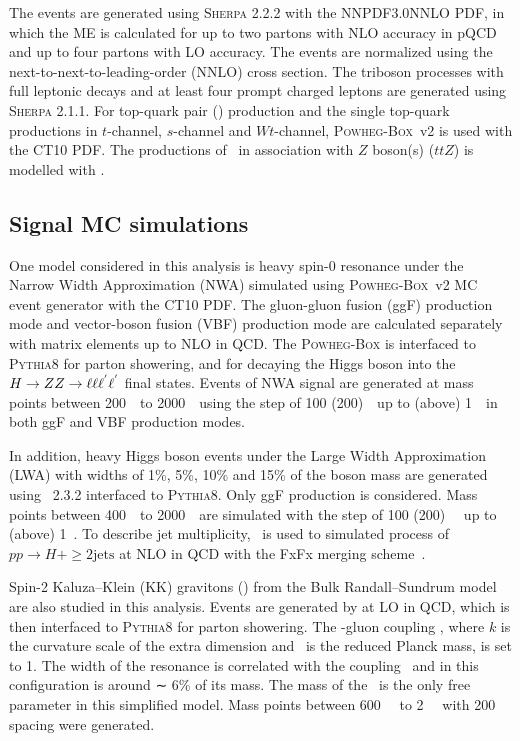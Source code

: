 The \Zjet events are generated using \textsc{Sherpa} 2.2.2 with the NNPDF3.0NNLO PDF,
in which the ME is calculated for up to two partons with NLO accuracy in pQCD and up to four partons with LO accuracy.
The \Zjet events are normalized using the next-to-next-to-leading-order (NNLO) cross section.
The triboson processes with full leptonic decays and at least four prompt charged leptons are generated using \textsc{Sherpa} 2.1.1.
For top-quark pair (\ttbar) production and the single top-quark productions in $t$-channel, $s$-channel and $Wt$-channel, \textsc{Powheg-Box}~v2 is used with the CT10 PDF.
The productions of \ttbar~in association with $Z$ boson(s) ($ttZ$) is modelled with \MGMCatNLO.

\subsection{Signal MC simulations}
\label{sec:hmhzz_signal_mc}

One model considered in this analysis is heavy spin-0 resonance under the Narrow Width Approximation (NWA) simulated using \textsc{Powheg-Box}~v2 MC event generator with the CT10 PDF.
The gluon-gluon fusion (ggF) production mode and vector-boson fusion (VBF) production mode are calculated separately with matrix elements up to NLO in QCD.
The \textsc{Powheg-Box} is interfaced to \textsc{Pythia8} for parton showering, and for decaying the Higgs boson into the $H \rightarrow ZZ \rightarrow \ell\ell\ell^{'}\ell^{'}$ final states.
Events of NWA signal are generated at mass points between 200~\gev~to 2000~\gev~using the step of 100 (200)~\gev~up to (above) 1~\tev~in both ggF and VBF production modes.

In addition, heavy Higgs boson events under the Large Width Approximation (LWA) with widths of 1\%, 5\%, 10\% and 15\% of the boson mass are generated using \MGMCatNLO~2.3.2 interfaced to \textsc{Pythia8}.
Only ggF production is considered.
Mass points between 400~\gev~to 2000~\gev~are simulated with the step of 100 (200)~\gev~ up to (above) 1~\tev.
To describe jet multiplicity, \MGMCatNLO~is used to simulated process of $pp\to H + \geq2\text{jets}$ at NLO in QCD with the FxFx merging scheme~\cite{Frederix2012}.

Spin-2 Kaluza–Klein (KK) gravitons (\Graviton) from the Bulk Randall–Sundrum model~\cite{graviton} are also studied in this analysis.
Events are generated by \MGMCatNLO at LO in QCD, which is then interfaced to \textsc{Pythia8} for parton showering.
The \Graviton-gluon coupling \kOverMpl, where $k$ is the curvature scale of the extra dimension and \Mpl~is the reduced Planck mass, is set to 1.
The width of the resonance is correlated with the coupling \kOverMpl~and in this configuration is around ∼ 6\% of its mass. 
The mass of the \Graviton~is the only free parameter in this simplified model.
Mass points between 600~\gev~ to 2~\tev~ with 200~\gev~ spacing were generated.
